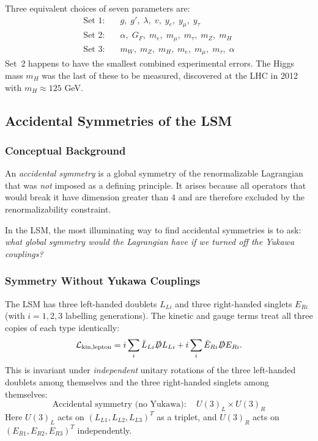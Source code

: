 Three equivalent choices of seven parameters are:
\begin{align*}
  \text{Set 1:}\quad &g,\; g',\; \lambda,\; v,\; y_e,\; y_\mu,\; y_\tau\\
  \text{Set 2:}\quad &\alpha,\; G_F,\; m_e,\; m_\mu,\; m_\tau,\; m_Z,\; m_H\\
  \text{Set 3:}\quad &m_W,\; m_Z,\; m_H,\; m_e,\; m_\mu,\; m_\tau,\; \alpha
\end{align*}
Set~2 happens to have the smallest combined experimental errors.
The Higgs mass $m_H$ was the last of these to be measured, discovered
at the LHC in 2012 with $m_H \approx 125$ GeV.

\subsection{Accidental Symmetries of the LSM}\label{subsec:lec19:accidental}

\subsubsection*{Conceptual Background}

An \emph{accidental symmetry} is a global symmetry of the renormalizable
Lagrangian that was \emph{not} imposed as a defining principle. It
arises because all operators that would break it have dimension
greater than 4 and are therefore excluded by the renormalizability
constraint.

In the LSM, the most illuminating way to find accidental symmetries
is to ask: \emph{what global symmetry would the Lagrangian have if
we turned off the Yukawa couplings?}

\subsubsection*{Symmetry Without Yukawa Couplings}

The LSM has three left-handed doublets $L_{Li}$ and three right-handed
singlets $E_{Ri}$ (with $i = 1,2,3$ labelling generations). The
kinetic and gauge terms treat all three copies of each type identically:
\begin{equation*}
  \mathcal{L}_{\rm kin,lepton} = i\sum_i\bar L_{Li}\slashed D L_{Li}
                          + i\sum_i\bar E_{Ri}\slashed D E_{Ri}.
\end{equation*}
This is invariant under \emph{independent} unitary rotations of the
three left-handed doublets among themselves and the three right-handed
singlets among themselves:
\begin{equation}
  \boxed{
    \text{Accidental symmetry (no Yukawa)}:\quad
    U(3)_L\times U(3)_R
  }
  \label{eq:lec19:u3xu3}
\end{equation}
Here $U(3)_L$ acts on $(L_{L1}, L_{L2}, L_{L3})^T$ as a triplet, and
$U(3)_R$ acts on $(E_{R1}, E_{R2}, E_{R3})^T$ independently.

